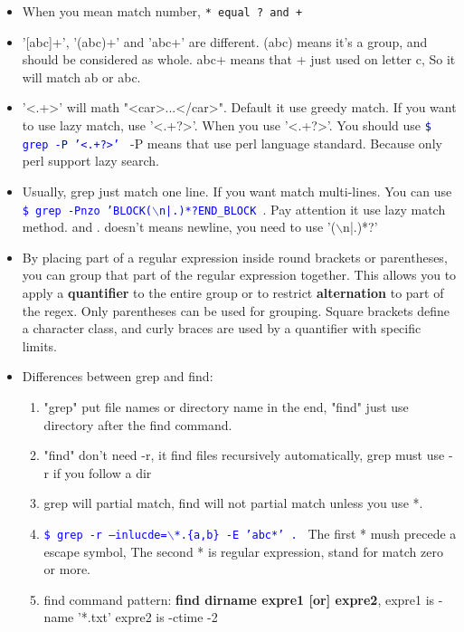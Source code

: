 \documentclass[a4paper,11pt,twoside]{book}
\newcommand{\linuxcommand}[1]{\texttt{\textcolor{blue}{\$ #1 \Pisymbol{psy}{191}}}}
\begin{document}
\begin{itemize}
\begin{tabular}{p{}|p{}|p{}}
\hline 
\end{tabular}

		\item When you mean match number, \verb=* equal ? and + = 

		\item '[abc]+',  '(abc)+' and 'abc+' are different.  (abc) means it's a group, and should be considered as whole. abc+ means that + just used on letter c, So it will match ab or abc.  

		\item '<.+>' will math "<car>...</car>". Default it use greedy match. If you want to use lazy match, use '<.+?>'. When you use '<.+?>'.  You should use \linuxcommand{grep -P '<.+?>'} -P means that use perl language standard. Because only perl support lazy search.  

		\item Usually, grep just match one line. If you want match multi-lines. You can use \linuxcommand{grep -Pnzo 'BLOCK($\backslash$n|.)*?END\_BLOCK }.  Pay attention it use lazy match method. and . doesn't means newline, you need to use '($\backslash$n|.)*?'

		\item By placing part of a regular expression inside round brackets or parentheses, you can group that part of the regular expression together. This allows you to apply a \textbf{quantifier} to the entire group or to restrict \textbf{alternation} to part of the regex.  Only parentheses can be used for grouping. Square brackets define a character class, and curly braces are used by a quantifier with specific limits.

		\item Differences between grep and find:
		\begin{enumerate}
				\item "grep" put file names or directory name in the end, "find" just use directory after the find command.
				\item "find" don't need -r, it find files recursively automatically, grep must use -r if you follow a dir

				\item grep will partial match, find will not partial match unless you use *.

				\item \linuxcommand{grep -r --inlucde=$\backslash$*.\{a,b\} -E 'abc*' .} The first * mush precede a escape symbol, The second * is regular expression, stand for match zero or more. 

				\item find command pattern: \textbf{find dirname expre1 [or] expre2}, expre1 is -name '*.txt' expre2 is -ctime -2 
		\end{enumerate}
\end{itemize}
\end{document}
